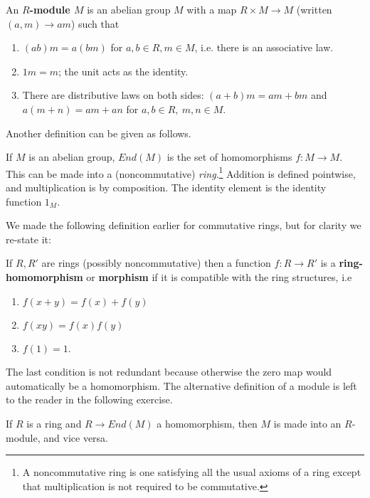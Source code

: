 \begin{definition} 
An \textbf{$R$-module $M$} is an abelian group $M$ with a map $R \times M \to
M$ (written $(a,m) \to am$) such that
\begin{enumerate}[\textbf{M} 1]
\item  $(ab) m = a(bm)$ for $a,b \in R, m \in M$, i.e. there is an associative law. 
\item $1m
= m$; the unit acts as the identity. 
\item There are distributive laws
on both sides:
$(a+b)m = am + bm$ and $a(m+n) = am + an$ for $a,b \in R, \ m,n \in M$.

\end{enumerate} \end{definition} 

Another definition can be given  as follows.
\begin{definition} 
If $M$ is an abelian group, $End(M)$ is the set of homomorphisms $f: M \to M$.  
This can be made into a (noncommutative) \emph{ring}.\footnote{A
noncommutative ring is one satisfying all the usual axioms of a ring except
that multiplication is not required to be commutative.} Addition is defined pointwise, and
multiplication is by composition. The identity element is the identity
function $1_M$.
\end{definition} 

We made the following definition earlier for commutative rings, but for
clarity we re-state it:
\begin{definition} 
If $R, R'$ are rings (possibly noncommutative) then a function $f: R \to R'$ is a
\textbf{ring-homomorphism}  or \textbf{morphism} if it is compatible with the
ring structures, i.e
\begin{enumerate}
\item  $f(x+y) = f(x) + f(y)$
\item $f(xy) = f(x)f(y)$
\item  $f(1) = 1$.
\end{enumerate}
\end{definition} 

The last condition is not redundant because otherwise the zero map would
automatically be a homomorphism.
The alternative definition of a module is left to the reader in the following
exercise.
\begin{exercise}
If $R$ is a ring and $R \to End(M)$ a homomorphism, then $M$ is made into an
$R$-module, and vice versa.  
\end{exercise}


